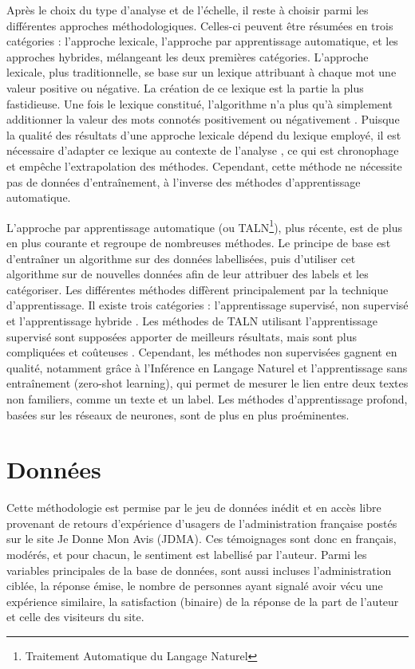 \documentclass[a4paper,12pt]{report}
\begin{document}
Après le choix du type d'analyse et de l'échelle, il reste à choisir parmi les différentes approches méthodologiques. Celles-ci peuvent être résumées en trois catégories : l'approche lexicale, l'approche par apprentissage automatique, et les approches hybrides, mélangeant les deux premières catégories. L'approche lexicale, plus traditionnelle, se base sur un lexique attribuant à chaque mot une valeur positive ou négative. La création de ce lexique est la partie la plus fastidieuse. Une fois le lexique constitué, l'algorithme n'a plus qu'à simplement additionner la valeur des mots connotés positivement ou négativement \parencite{hemmatian19}. Puisque la qualité des résultats d'une approche lexicale dépend du lexique employé, il est nécessaire d'adapter ce lexique au contexte de l'analyse \parencite{ligthart21}, ce qui est chronophage et empêche l'extrapolation des méthodes. Cependant, cette méthode ne nécessite pas de données d'entraînement, à l'inverse des méthodes d'apprentissage automatique. \par

L'approche par apprentissage automatique (ou TALN\footnote{Traitement Automatique du Langage Naturel}), plus récente, est de plus en plus courante et regroupe de nombreuses méthodes. Le principe de base est d'entraîner un algorithme sur des données labellisées, puis d'utiliser cet algorithme sur de nouvelles données afin de leur attribuer des labels et les catégoriser. Les différentes méthodes diffèrent principalement par la technique d'apprentissage. Il existe trois catégories : l'apprentissage supervisé, non supervisé et l'apprentissage hybride \parencite{ligthart21}. Les méthodes de TALN utilisant l'apprentissage supervisé sont supposées apporter de meilleurs résultats, mais sont plus compliquées et coûteuses \parencite{hemmatian19}. Cependant, les méthodes non supervisées gagnent en qualité, notamment grâce à l'Inférence en Langage Naturel et l'apprentissage sans entraînement (zero-shot learning), qui permet de mesurer le lien entre deux textes non familiers, comme un texte et un label. Les méthodes d'apprentissage profond, basées sur les réseaux de neurones, sont de plus en plus proéminentes. \par

\section{Données}
Cette méthodologie est permise par le jeu de données inédit et en accès libre provenant de retours d'expérience d'usagers de l'administration française postés sur le site Je Donne Mon Avis (JDMA). Ces témoignages sont donc en français, modérés, et pour chacun, le sentiment est labellisé par l'auteur. Parmi les variables principales de la base de données, sont aussi incluses l'administration ciblée, la réponse émise, le nombre de personnes ayant signalé avoir vécu une expérience similaire, la satisfaction (binaire) de la réponse de la part de l'auteur et celle des visiteurs du site. \par
\end{document}
